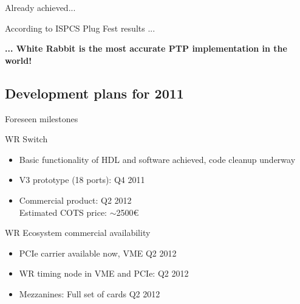\documentclass[compress,red]{beamer}
\begin{document}
\begin{frame}{Already achieved...}
  \begin{block}{According to ISPCS Plug Fest results ...}
    \begin{center}
      \textbf{... White Rabbit is the most accurate PTP implementation in the world!}
  \end{center}
  \end{block}
\end{frame}

\subsection{Development plans for 2011}


\begin{frame}{Foreseen milestones}

  \begin{block}{WR Switch}
    \begin{itemize} 
      \item Basic functionality of HDL and software achieved, code cleanup underway
      \item V3 prototype (18 ports): Q4 2011
      \item Commercial product: Q2 2012 \\Estimated COTS price:
        $\sim$2500\euro
      \end{itemize}
    \end{block}

  \begin{block}{WR Ecosystem commercial availability}
    \begin{itemize} 
      \item PCIe carrier available now, VME Q2 2012
      \item WR timing node in VME and PCIe: Q2 2012
      \item Mezzanines: Full set of cards Q2 2012
      \end{itemize}
    \end{block}

\end{frame}
\end{document}
